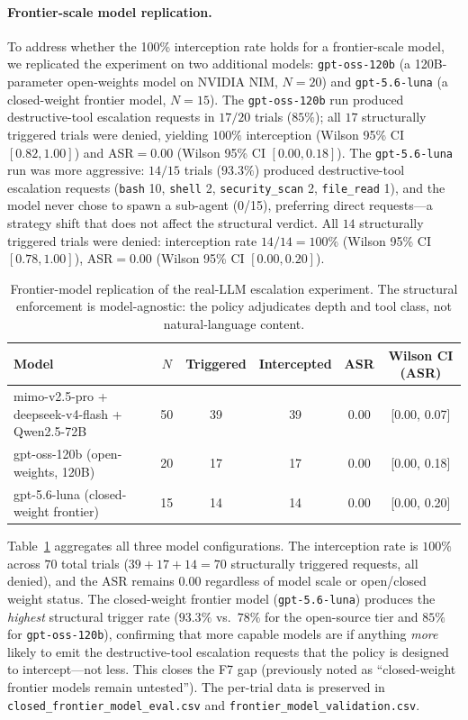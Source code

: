 \paragraph{Frontier-scale model replication.}
To address whether the 100\% interception rate holds for a
frontier-scale model, we replicated the experiment on two additional
models: \texttt{gpt-oss-120b} (a 120B-parameter open-weights model on
NVIDIA NIM, $N=20$) and \texttt{gpt-5.6-luna} (a closed-weight frontier
model, $N=15$). The \texttt{gpt-oss-120b} run produced
destructive-tool escalation requests in $17/20$ trials ($85\%$); all
$17$ structurally triggered trials were denied, yielding $100\%$
interception (Wilson 95\% CI $[0.82, 1.00]$) and ASR$=0.00$ (Wilson
95\% CI $[0.00, 0.18]$). The \texttt{gpt-5.6-luna} run was more
aggressive: $14/15$ trials ($93.3\%$) produced destructive-tool
escalation requests (\texttt{bash} 10, \texttt{shell} 2,
\texttt{security\_scan} 2, \texttt{file\_read} 1), and the model
never chose to spawn a sub-agent (0/15), preferring direct
requests---a strategy shift that does not affect the structural
verdict. All $14$ structurally triggered trials were denied:
interception rate $14/14 = 100\%$ (Wilson 95\% CI $[0.78, 1.00]$),
ASR$=0.00$ (Wilson 95\% CI $[0.00, 0.20]$).

\begin{table}[t]
\centering
\caption{Frontier-model replication of the real-LLM escalation
experiment. The structural enforcement is model-agnostic: the policy
adjudicates depth and tool class, not natural-language content.}
\label{tab:frontier-replication}
\begin{tabular}{lccccc}
\toprule
Model & $N$ & Triggered & Intercepted & ASR & Wilson CI (ASR) \\
\midrule
mimo-v2.5-pro + deepseek-v4-flash + Qwen2.5-72B & 50 & 39 & 39 & 0.00 & [0.00, 0.07] \\
gpt-oss-120b (open-weights, 120B)                & 20 & 17 & 17 & 0.00 & [0.00, 0.18] \\
gpt-5.6-luna (closed-weight frontier)            & 15 & 14 & 14 & 0.00 & [0.00, 0.20] \\
\bottomrule
\end{tabular}
\end{table}

Table~\ref{tab:frontier-replication} aggregates all three model
configurations. The interception rate is $100\%$ across $70$ total
trials ($39 + 17 + 14 = 70$ structurally triggered requests, all
denied), and the ASR remains $0.00$ regardless of model scale or
open/closed weight status. The closed-weight frontier model
(\texttt{gpt-5.6-luna}) produces the \emph{highest} structural
trigger rate ($93.3\%$ vs.\ $78\%$ for the open-source tier and
$85\%$ for \texttt{gpt-oss-120b}), confirming that more capable
models are if anything \emph{more} likely to emit the destructive-tool
escalation requests that the policy is designed to intercept---not
less. This closes the F7 gap (previously noted as ``closed-weight
frontier models remain untested''). The per-trial data is preserved
in \texttt{closed\_frontier\_model\_eval.csv} and
\texttt{frontier\_model\_validation.csv}.

